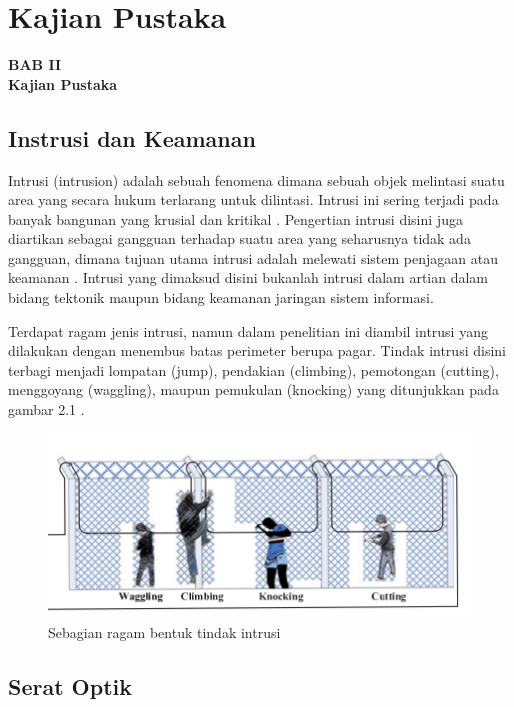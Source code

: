 \documentclass[12pt]{article}
\begin{document}
\newpage

	\setcounter{figure}{0}

	\section{Kajian Pustaka}
	
	\begin{center}
		{\large \textbf{BAB II}} \\
		{\large \textbf{Kajian Pustaka}}
	\end{center}

	\subsection{Instrusi dan Keamanan}
	
	Intrusi (intrusion) adalah sebuah fenomena dimana sebuah objek melintasi suatu area yang secara hukum terlarang untuk dilintasi.
	Intrusi ini sering terjadi pada banyak bangunan yang krusial dan kritikal \cite{Quwaider2017}.
	Pengertian intrusi disini juga diartikan sebagai gangguan terhadap suatu area yang seharusnya tidak ada gangguan, dimana tujuan utama intrusi adalah melewati sistem penjagaan atau keamanan \cite{Chapman}.
	Intrusi yang dimaksud disini bukanlah intrusi dalam artian dalam bidang tektonik maupun bidang keamanan jaringan sistem informasi.
	
	Terdapat ragam jenis intrusi, namun dalam penelitian ini diambil intrusi yang dilakukan dengan menembus batas perimeter berupa pagar.
	Tindak intrusi disini terbagi menjadi lompatan (jump), pendakian (climbing), pemotongan (cutting), menggoyang (waggling), maupun pemukulan (knocking) yang ditunjukkan pada gambar 2.1 \cite{Huang2017}.

	\begin{figure}[!ht]
		\centering
		\captionsetup{justification=centering}
   		\includegraphics[width=0.7\linewidth]{images/Bab_2/Bab_2_1}
		\caption[Ragam Intrusi]{\small{Sebagian ragam bentuk tindak intrusi}}
	\end{figure}

	\subsection{Serat Optik}
	
\end{document}
